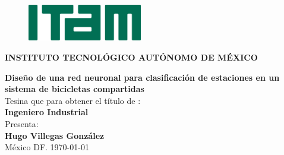 \documentclass[12pt,spanish]{article}
\begin{document}
	\thispagestyle{empty}
	\begin{figure}
		\centering
		\includegraphics[width=5cm]{Imagenes/Logo_ITAM.jpg}\\
	\end{figure}
	\begin{center}
		\textbf{\large {INSTITUTO  TECNOLÓGICO AUTÓNOMO DE MÉXICO}}\\[0.3cm]
		\vspace{2.5cm}
		
		{\LARGE\textbf{Diseño de una red neuronal para clasificación de estaciones en un sistema de bicicletas compartidas}}\\[1.6cm]
		{\normalsize Tesina que para obtener el título de :}\\[0.1cm]
		{\large  \textbf{Ingeniero Industrial}}\\[2.1cm]
		{\normalsize Presenta: }\\[0.1cm]
		{\large  \textbf{Hugo Villegas González}}\\[2.1cm]
		México DF.  \today
	\end{center}
	\newpage
	\tableofcontents                                %
	\newpage 
	\listoffigures                                  %
	\newpage 
	\listoftables                                   %
	\newpage
	
\end{document}
